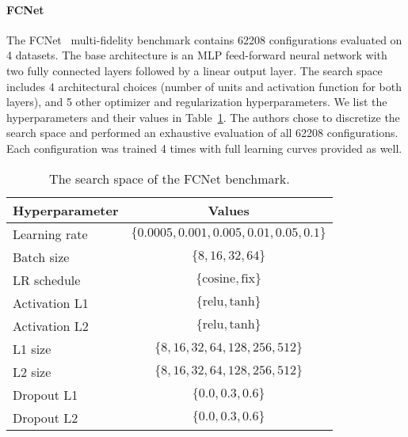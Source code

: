 \paragraph{FCNet}
The FCNet~\cite{klein2019tabular} multi-fidelity benchmark contains 62208 configurations evaluated on 4 datasets. The base architecture is an MLP feed-forward neural network with two fully connected layers followed by a linear output layer. The search space includes 4 architectural choices (number of units and activation function for both layers), and 5 other optimizer and regularization hyperparameters. We list the hyperparameters and their values in Table~\ref{tab:fcnet}. The authors chose to discretize the search space and performed an exhaustive evaluation of all 62208 configurations. Each configuration was trained 4 times with full learning curves provided as well.

\begin{table}
    \centering
\begin{tabular}{lc}
    \toprule
    Hyperparameter & Values \\
    \midrule
    Learning rate & $\{0.0005, 0.001, 0.005, 0.01, 0.05, 0.1\}$ \\
    Batch size & $\{8, 16, 32, 64\}$ \\
    LR schedule & $\{\text{cosine}, \text{fix} \}$ \\
    Activation L1 & $\{\text{relu}, \text{tanh} \}$ \\
    Activation L2 & $\{\text{relu}, \text{tanh} \}$ \\
    L1 size & $\{8, 16, 32, 64, 128, 256, 512\}$ \\
    L2 size & $\{8, 16, 32, 64, 128, 256, 512\}$ \\
    Dropout L1 & $\{0.0, 0.3, 0.6\}$ \\
    Dropout L2 & $\{0.0, 0.3, 0.6\}$ \\
    \bottomrule
    \end{tabular}
    \caption{The search space of the FCNet benchmark.}
    \label{tab:fcnet}
\end{table}

